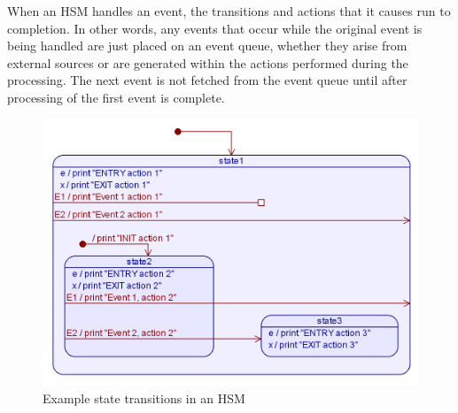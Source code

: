 \documentclass[12pt]{article}
\begin{document}
When an HSM handles an event, the transitions and actions that it causes run to completion. In other words, any events that occur while the original event is being handled are just placed on an event queue,  whether they arise from external sources or are generated within the actions performed during the processing. The next event is not fetched from the event queue until after processing of the first event is complete.

\begin{figure}[h]
\centering
\includegraphics[width=0.7\linewidth]{SM_of_Example_1}
\caption[Example of state transitions in an HSM]{Example state transitions in an HSM}
\label{fig:smofexample1}
\end{figure}
\end{document}
